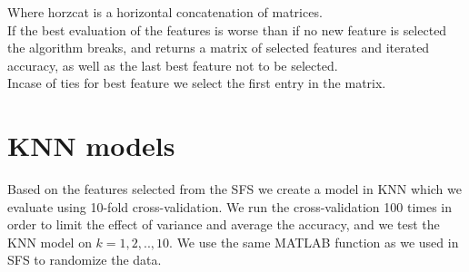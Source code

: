 Where horzcat is a horizontal concatenation of matrices.\\
If the best evaluation of the features is worse than if no new feature is selected the algorithm breaks, and returns a matrix of selected features and iterated accuracy, as well as the last best feature not to be selected.\\
Incase of ties for best feature we select the first entry in the matrix.

\section{KNN models}
Based on the features selected from the SFS we create a model in KNN which we evaluate using 10-fold cross-validation. We run the cross-validation 100 times in order to limit the effect of variance and average the accuracy, and we test the KNN model on $k = 1,2,..,10$. We use the same MATLAB function as we used in SFS to randomize the data.


